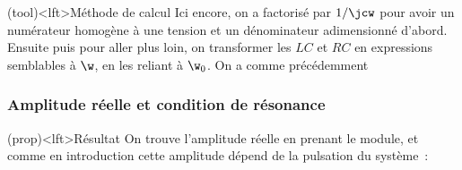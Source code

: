 \documentclass[../../main/main.tex]{subfiles}
\begin{document}
\begin{tcb}(tool)<lft>{Méthode de calcul}
	Ici encore, on a factorisé par $1/\jcw$ pour avoir un numérateur homogène
	à une tension et
	un dénominateur adimensionné d'abord. Ensuite puis pour aller plus loin, on
	transformer les $LC$ et $RC$ en expressions semblables à $\w$, en les
	reliant à $\w_0$. On a comme précédemment
\end{tcb}

\subsubsection{Amplitude réelle et condition de résonance}
\begin{tcb}(prop)<lft>{Résultat}
	On trouve l'amplitude réelle en prenant le module, et comme en introduction
	cette amplitude dépend de la pulsation du système~:
	\psw{
		\[
			\boxed{
				U(\w)
				= \abs{\Uu}
				= \frac{E_0}{
					\sqrt{\left( 1 - \left(\dfrac{\w}{\w_0}\right)^2 \right)^2
						+ \left(\dfrac{\w}{Q\w_0}\right)^2}}
			}
		\]
	}
\end{tcb}
\end{document}
